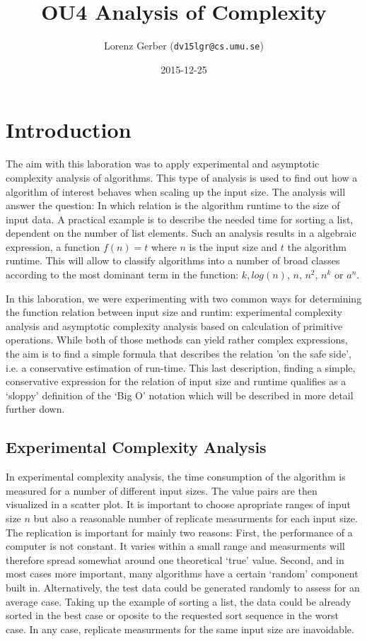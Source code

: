 \documentclass[a4paper,11pt,twoside]{article}
\title{OU4 Analysis of Complexity}
\author{Lorenz Gerber  ({\tt{dv15lgr@cs.umu.se}})}
\date{2015-12-25}
\begin{document}
\lstset{language=C}
\maketitle

\tableofcontents
\newpage

\section{Introduction} 
The aim with this laboration was to apply experimental and asymptotic
complexity analysis of algorithms. This type of analysis is used to
find out how a algorithm of interest behaves when scaling up the input
size. The analysis will answer the question: In which relation is
the algorithm runtime to the size of input data. A practical 
example is to describe the needed time for sorting a list, dependent 
on the number of list elements. Such an analysis results in a algebraic
expression, a function $f(n) = t$ where $n$ is the input size and $t$
the algorithm runtime. This will allow to classify algorithms into a
number of broad classes according to the most dominant term in the 
function: $k, log(n)$, $n$, $n^2$, $n^k$ or $a^n$.

In this laboration, we were experimenting with two common ways for
determining the function relation between input size and runtim:
experimental complexity analysis and asymptotic complexity analysis
based on calculation of primitive operations. While both of those
methods can yield rather complex expressions, the aim is to find a
simple formula that describes the relation 'on the safe side', i.e. a
conservative estimation of run-time. This last description, finding
a simple, conservative expression for the relation of input size and
runtime qualifies as a `sloppy' definition of the `Big O' notation
which will be described in more detail further down.

\subsection{Experimental Complexity Analysis}
In experimental complexity analysis, the time consumption of the
algorithm is measured for a number of different input sizes. The value
pairs are then visualized in a scatter plot. It is important to choose
apropriate ranges of input size $n$ but also a reasonable number of
replicate measurments for each input size. 
The replication is important for mainly two reasons: First, the performance of a computer
is not constant. It varies within a small range and measurments will
therefore spread somewhat around one theoretical `true' value. Second,
and in most cases more important, many algorithms have a certain
`random' component built in. Alternatively, the test data could be
generated randomly to assess for an average case. Taking up the
example of sorting a list, the data could be already sorted in the
best case or oposite to the requested sort sequence in the worst
case. In any case, replicate measurments for the same input size are
inavoidable.
\end{document}
